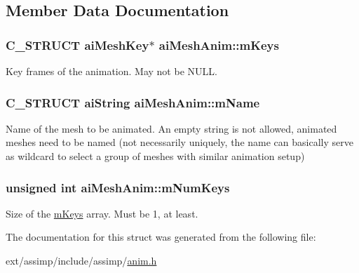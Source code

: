 \subsection{Member Data Documentation}
\hypertarget{structai_mesh_anim_abc78e9f6d7583c541447e8c389488f1b}{
\subsubsection[{m\-Keys}]{\setlength{\rightskip}{0pt plus 5cm}C\-\_\-\-S\-T\-R\-U\-C\-T {\bf ai\-Mesh\-Key}$\ast$ ai\-Mesh\-Anim\-::m\-Keys}}\label{structai_mesh_anim_abc78e9f6d7583c541447e8c389488f1b}
Key frames of the animation. May not be N\-U\-L\-L. \hypertarget{structai_mesh_anim_a20751a739377fdba514c676ef4bda4c7}{
\subsubsection[{m\-Name}]{\setlength{\rightskip}{0pt plus 5cm}C\-\_\-\-S\-T\-R\-U\-C\-T {\bf ai\-String} ai\-Mesh\-Anim\-::m\-Name}}\label{structai_mesh_anim_a20751a739377fdba514c676ef4bda4c7}
Name of the mesh to be animated. An empty string is not allowed, animated meshes need to be named (not necessarily uniquely, the name can basically serve as wildcard to select a group of meshes with similar animation setup) \hypertarget{structai_mesh_anim_aa8702d42bf619ccc8414a556f41634d8}{
\subsubsection[{m\-Num\-Keys}]{\setlength{\rightskip}{0pt plus 5cm}unsigned int ai\-Mesh\-Anim\-::m\-Num\-Keys}}\label{structai_mesh_anim_aa8702d42bf619ccc8414a556f41634d8}
Size of the \hyperlink{structai_mesh_anim_abc78e9f6d7583c541447e8c389488f1b}{m\-Keys} array. Must be 1, at least. 

The documentation for this struct was generated from the following file\-:\begin{DoxyCompactItemize}
\item 
ext/assimp/include/assimp/\hyperlink{anim_8h}{anim.\-h}\end{DoxyCompactItemize}
